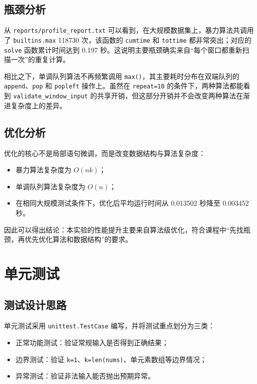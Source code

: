 \documentclass[UTF8,a4paper,12pt]{ctexart}
\begin{document}
\subsection{瓶颈分析}
从 \texttt{reports/profile\_report.txt} 可以看到，在大规模数据集上，暴力算法共调用了
\texttt{builtins.max} 118730 次，该函数的 \texttt{cumtime} 和 \texttt{tottime} 都非常突出；对应的 \texttt{solve} 函数累计时间达到 0.197 秒。这说明主要瓶颈确实来自“每个窗口都重新扫描一次”的重复计算。

相比之下，单调队列算法不再频繁调用 \texttt{max()}，其主要耗时分布在双端队列的 \texttt{append}、\texttt{pop} 和 \texttt{popleft} 操作上。虽然在 \texttt{repeat=10} 的条件下，两种算法都能看到 \texttt{validate\_window\_input} 的共享开销，但这部分开销并不会改变两种算法在渐进复杂度上的差异。

\subsection{优化分析}
优化的核心不是局部语句微调，而是改变数据结构与算法复杂度：
\begin{itemize}
    \item 暴力算法复杂度为 \(O(nk)\)；
    \item 单调队列算法复杂度为 \(O(n)\)；
    \item 在相同大规模测试条件下，优化后平均运行时间从 0.013502 秒降至 0.003452 秒。
\end{itemize}
因此可以得出结论：本实验的性能提升主要来自算法级优化，符合课程中“先找瓶颈，再优先优化算法和数据结构”的要求。

\section{单元测试}
\subsection{测试设计思路}
单元测试采用 \texttt{unittest.TestCase} 编写，并将测试重点划分为三类：
\begin{itemize}
    \item 正常功能测试：验证常规输入是否得到正确结果；
    \item 边界测试：验证 \texttt{k=1}、\texttt{k=len(nums)}、单元素数组等边界情况；
    \item 异常测试：验证非法输入能否抛出预期异常。
\end{itemize}
\end{document}
